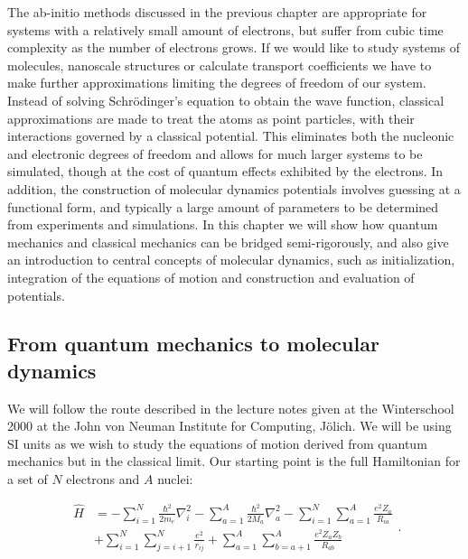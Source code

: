 The ab-initio methods discussed in the previous chapter
are appropriate for systems with a relatively small amount of electrons,
but suffer from cubic time complexity as the number of electrons grows.
If we would like to study systems of molecules, nanoscale structures
or calculate transport coefficients we have to make further approximations
limiting the degrees of freedom of our system.
Instead of solving Schr\"{o}dinger's equation to obtain
the wave function, classical approximations are made to
treat the atoms as point particles, with their interactions
governed by a classical potential. This eliminates both the nucleonic
and electronic degrees of freedom and allows for much larger systems
to be simulated, though at the cost of quantum effects
exhibited by the electrons. In addition, the construction
of molecular dynamics potentials involves guessing at a functional
form, and typically a large amount of parameters to be determined
from experiments and simulations.
In this chapter we will show how quantum mechanics
and classical mechanics can be bridged semi-rigorously,
and also give an introduction to central concepts of molecular dynamics,
such as initialization, integration of the equations of motion
and construction and evaluation of potentials.

\subsection{From quantum mechanics to molecular dynamics}
We will follow the route described in the lecture notes
\parencite[Marx, Dominik and Hutter, J\"{o}rg][pages 1-10]{marx2000}
given at the Winterschool 2000 at the John von Neuman Institute
for Computing, J\"{o}lich.
We will be using SI units as we wish to study the equations of motion
derived from quantum mechanics but in the classical limit.
Our starting point is the full Hamiltonian 
for a set of $N$ electrons and $A$ nuclei:

\begin{equation}
    \begin{split}
        \hat{H}
        &= -\sum_{i=1}^N \frac{\hbar^2}{2m_e} \nabla_i^2
        -\sum_{a=1}^A \frac{\hbar^2}{2M_a} \nabla_a^2
        -\sum_{i=1}^N \sum_{a=1}^A \frac{e^2 Z_a}{R_{ia}} \\
        &+ \sum_{i=1}^N \sum_{j=i+1}^N \frac{e^2}{r_{ij}}
        + \sum_{a=1}^A \sum_{b=a+1}^A \frac{e^2 Z_a Z_b}{R_{ab}}
    \end{split} .
\end{equation}

